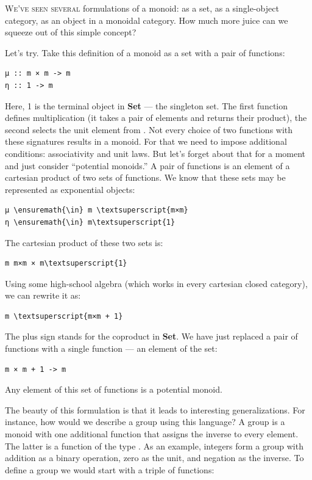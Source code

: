 \lettrine[lhang=0.17]{W}{e've seen several} formulations of a monoid: as a set, as a
single-object category, as an object in a monoidal category. How much
more juice can we squeeze out of this simple concept?

Let's try. Take this definition of a monoid as a set  with a
pair of functions:

\begin{verbatim}
μ :: m × m -> m
η :: 1 -> m
\end{verbatim}
Here, 1 is the terminal object in \textbf{Set} --- the singleton set.
The first function defines multiplication (it takes a pair of elements
and returns their product), the second selects the unit element from
. Not every choice of two functions with these signatures
results in a monoid. For that we need to impose additional conditions:
associativity and unit laws. But let's forget about that for a moment
and just consider ``potential monoids.'' A pair of functions is an
element of a cartesian product of two sets of functions. We know that
these sets may be represented as exponential objects:

\begin{Verbatim}[commandchars=\\\{\}]
μ \ensuremath{\in} m \textsuperscript{m×m}
η \ensuremath{\in} m\textsuperscript{1}
\end{Verbatim}
The cartesian product of these two sets is:

\begin{Verbatim}[commandchars=\\\{\}]
m m×m × m\textsuperscript{1}
\end{Verbatim}
Using some high-school algebra (which works in every cartesian closed
category), we can rewrite it as:

\begin{Verbatim}[commandchars=\\\{\}]
m \textsuperscript{m×m + 1}
\end{Verbatim}
The plus sign stands for the coproduct in \textbf{Set}. We have just
replaced a pair of functions with a single function --- an element of
the set:

\begin{verbatim}
m × m + 1 -> m
\end{verbatim}
Any element of this set of functions is a potential monoid.

The beauty of this formulation is that it leads to interesting
generalizations. For instance, how would we describe a group using this
language? A group is a monoid with one additional function that assigns
the inverse to every element. The latter is a function of the type
. As an example, integers form a group with
addition as a binary operation, zero as the unit, and negation as the
inverse. To define a group we would start with a triple of functions:

